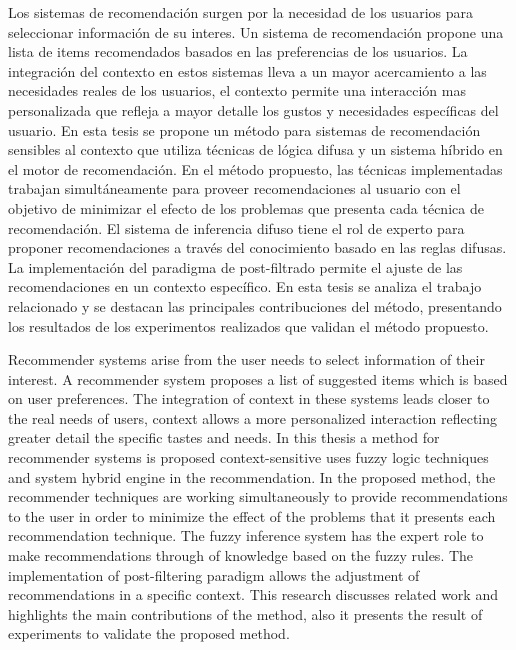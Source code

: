
Los sistemas de recomendaci\'on surgen por la necesidad 
de los usuarios para seleccionar informaci\'on de su interes. 
Un sistema de recomendaci\'on propone una lista de items 
recomendados basados en las preferencias de los usuarios. 
La integraci\'on del contexto en estos sistemas lleva a 
un mayor acercamiento a las necesidades reales de los 
usuarios, el contexto permite una interacci\'on mas 
personalizada que refleja a mayor detalle los gustos y 
necesidades espec\'ificas del usuario. En esta tesis se 
propone un m\'etodo para sistemas de recomendaci\'on 
sensibles al contexto que utiliza t\'ecnicas de l\'ogica 
difusa y un sistema h\'ibrido en el motor de recomendaci\'on. 
En el m\'etodo propuesto, las t\'ecnicas implementadas 
trabajan simult\'aneamente para proveer recomendaciones 
al usuario con el objetivo de minimizar el efecto de 
los problemas que presenta cada t\'ecnica de 
recomendaci\'on. El sistema de inferencia difuso 
tiene el rol de experto para proponer recomendaciones 
a trav\'es del conocimiento basado en las reglas difusas. 
La implementaci\'on del paradigma de post-filtrado 
permite el ajuste de las recomendaciones en un 
contexto espec\'ifico. En esta tesis se analiza el 
trabajo relacionado y se destacan las principales 
contribuciones del m\'etodo, presentando los resultados 
de los experimentos realizados que validan el 
m\'etodo propuesto.


Recommender systems arise from the user needs
to select information of their interest. 
A recommender system
proposes a list of suggested items which is based on
user preferences. The integration of context in these
systems leads closer to the real needs of
users, context allows a more personalized interaction
reflecting greater detail the specific tastes and needs.
In this thesis a method for recommender systems is 
proposed context-sensitive uses fuzzy logic techniques 
and system hybrid engine in the recommendation. 
In the proposed method, the recommender techniques 
are working simultaneously to provide recommendations 
to the user in order to minimize the effect of the 
problems that it presents each recommendation technique. 
The fuzzy inference system has the expert role to 
make recommendations through of knowledge based on 
the fuzzy rules. The implementation of post-filtering 
paradigm allows the adjustment of recommendations in a 
specific context. This research discusses related work 
and highlights the main contributions of the method, 
also it presents the result of experiments 
to validate the proposed method.












